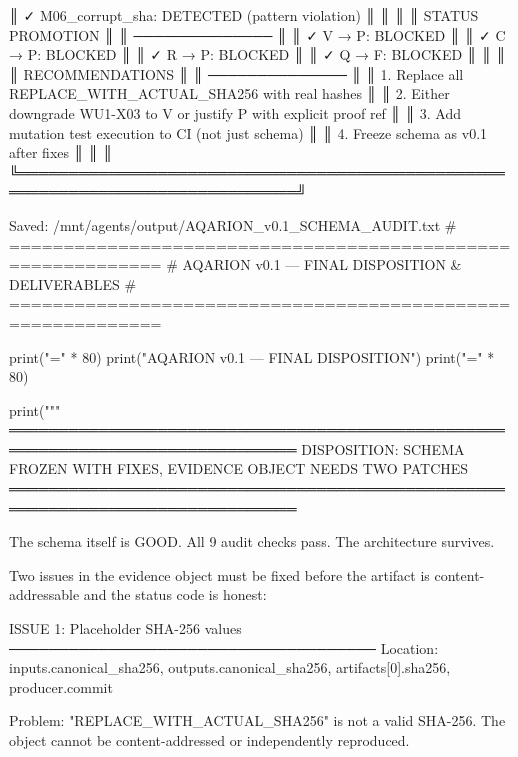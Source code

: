 ║  ✓ M06_corrupt_sha: DETECTED (pattern violation)                            ║
║                                                                              ║
║  STATUS PROMOTION                                                            ║
║  ──────────────                                                              ║
║  ✓ V → P: BLOCKED                                                           ║
║  ✓ C → P: BLOCKED                                                           ║
║  ✓ R → P: BLOCKED                                                           ║
║  ✓ Q → F: BLOCKED                                                           ║
║                                                                              ║
║  RECOMMENDATIONS                                                             ║
║  ──────────────                                                              ║
║  1. Replace all REPLACE_WITH_ACTUAL_SHA256 with real hashes                 ║
║  2. Either downgrade WU1-X03 to V or justify P with explicit proof ref      ║
║  3. Add mutation test execution to CI (not just schema)                       ║
║  4. Freeze schema as v0.1 after fixes                                        ║
║                                                                              ║
╚══════════════════════════════════════════════════════════════════════════════╝


Saved: /mnt/agents/output/AQARION_v0.1_SCHEMA_AUDIT.txt
# ============================================================
# AQARION v0.1 — FINAL DISPOSITION & DELIVERABLES
# ============================================================

print("=" * 80)
print("AQARION v0.1 — FINAL DISPOSITION")
print("=" * 80)

print("""
═══════════════════════════════════════════════════════════════════════════════
DISPOSITION: SCHEMA FROZEN WITH FIXES, EVIDENCE OBJECT NEEDS TWO PATCHES
═══════════════════════════════════════════════════════════════════════════════

The schema itself is GOOD. All 9 audit checks pass. The architecture survives.

Two issues in the evidence object must be fixed before the artifact is
content-addressable and the status code is honest:

ISSUE 1: Placeholder SHA-256 values
─────────────────────────────────────
  Location: inputs.canonical_sha256, outputs.canonical_sha256, 
           artifacts[0].sha256, producer.commit
  
  Problem: "REPLACE_WITH_ACTUAL_SHA256" is not a valid SHA-256.
  The object cannot be content-addressed or independently reproduced.
  
